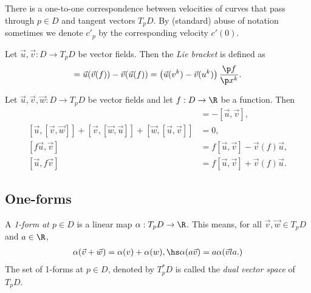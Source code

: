 \documentclass{article}
\begin{document}
\begin{corollary}
    There is a one-to-one correspondence between velocities of curves that pass through 
    $p\in D$ and tangent vectors $T_pD$. By (standard) abuse of notation sometimes 
    we denote $c'_p$ by the corresponding velocity $c'(0)$.
\end{corollary}

\begin{definition}
    Let $\vec u,\vec v:D\to T_pD$ be vector fields. Then the \emph{Lie bracket} is defined as 
    \begin{align*}
        [\vec u, \vec v] = \vec u(\vec v(f)) - \vec v(\vec u(f)) 
        = \left(\vec u(v^k)-\vec v(u^k)\right)\frac{\p f}{\p x^k}.
    \end{align*}
\end{definition}

\begin{lemma}
    Let $\vec u, \vec v, \vec w:D\to T_pD$ be vector fields and let $f:D\to\R$ be a
    function. Then 
    \begin{align*}
        [\vec v, \vec u] &= -[\vec u, \vec v],\\
        [\vec u, [\vec v, \vec w]] + [\vec v, [\vec w, \vec u]] + [\vec w, [\vec u, \vec v]] &= 0,\\
        [f\vec u, \vec v] &= f[\vec u,\vec v]-\vec v(f)\vec u,\\
        [\vec u, f\vec v] &= f[\vec u,\vec v]+\vec v(f)\vec u.
    \end{align*}
\end{lemma}

\subsection{One-forms}

\begin{definition}
    A \emph{1-form at $p\in D$} is a linear map $\alpha:T_pD \to \R$. This means, for all
    $\vec v, \vec w\in T_pD$ and $a\in\R$,
    \begin{align*}
        \alpha(\vec v + \vec w) = \alpha(v) + \alpha(w),\hs \alpha(a\vec v) = a\alpha(\vec v    la.)
    \end{align*}
    The set of 1-forms at $p\in D$, denoted by $T^*_p D$ is called the \emph{dual vector space}
    of $T_p D$.
\end{definition}
\end{document}
